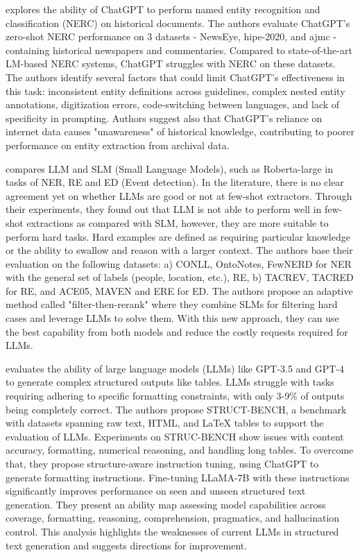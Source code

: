 \cite{gonzalez2023yes} explores the ability of ChatGPT to perform named entity recognition and classification (NERC) on historical documents. 
The authors evaluate ChatGPT's zero-shot NERC performance on 3 datasets - NewsEye, hipe-2020, and ajmc - containing historical newspapers and commentaries.
Compared to state-of-the-art LM-based NERC systems, ChatGPT struggles with NERC on these datasets.
The authors identify several factors that could limit ChatGPT's effectiveness in this task: inconsistent entity definitions across guidelines, complex nested entity annotations, digitization errors, code-switching between languages, and lack of specificity in prompting.
Authors suggest also that ChatGPT's reliance on internet data causes "unawareness" of historical knowledge, contributing to poorer performance on entity extraction from archival data.


\cite{ma2023large} compares LLM and SLM (Small Language Models), such as Roberta-large in tasks of NER, RE and ED (Event detection). In the literature, there is no clear agreement yet on whether LLMs are good or not at few-shot extractors. 
Through their experiments, they found out that LLM is not able to perform well in few-shot extractions as compared with SLM, however, they are more suitable to perform hard tasks. Hard examples are defined as requiring particular knowledge or the ability to swallow and reason with a larger context. 
The authors base their evaluation on the following datasets: a) CONLL, OntoNotes, FewNERD for NER with the general set of labels (people, location, etc.), RE, b) TACREV, TACRED for RE, and ACE05, MAVEN and ERE for ED. 
The authors propose an adaptive method called "filter-then-rerank" where they combine SLMs for filtering hard cases and leverage LLMs to solve them. 
With this new approach, they can use the best capability from both models and reduce the costly requests required for LLMs. 

\cite{tang2023struc} evaluates the ability of large language models (LLMs) like GPT-3.5 and GPT-4 to generate complex structured outputs like tables. 
LLMs struggle with tasks requiring adhering to specific formatting constraints, with only 3-9\% of outputs being completely correct.
The authors propose STRUCT-BENCH, a benchmark with datasets spanning raw text, HTML, and LaTeX tables to support the evaluation of LLMs.
Experiments on STRUC-BENCH show issues with content accuracy, formatting, numerical reasoning, and handling long tables. 
To overcome that, they propose structure-aware instruction tuning, using ChatGPT to generate formatting instructions.
Fine-tuning LLaMA-7B with these instructions significantly improves performance on seen and unseen structured text generation.
They present an ability map assessing model capabilities across coverage, formatting, reasoning, comprehension, pragmatics, and hallucination control.
This analysis highlights the weaknesses of current LLMs in structured text generation and suggests directions for improvement.


